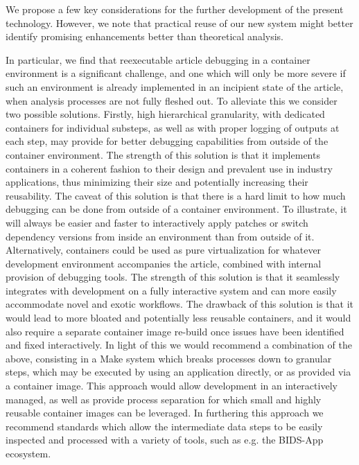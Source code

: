 We propose a few key considerations for the further development of the present technology.
However, we note that practical reuse of our new system might better identify promising enhancements better than theoretical analysis.

In particular, we find that reexecutable article debugging in a container environment is a significant challenge, and one which will only be more severe if such an environment is already implemented in an incipient state of the article, when analysis processes are not fully fleshed out.
To alleviate this we consider two possible solutions.
Firstly, high hierarchical granularity, with dedicated containers for individual substeps, as well as with proper logging of outputs at each step, may provide for better debugging capabilities from outside of the container environment.
The strength of this solution is that it implements containers in a coherent fashion to their design and prevalent use in industry applications, thus minimizing their size and potentially increasing their reusability.
The caveat of this solution is that there is a hard limit to how much debugging can be done from outside of a container environment.
To illustrate, it will always be easier and faster to interactively apply patches or switch dependency versions from inside an environment than from outside of it.
Alternatively, containers could be used as pure virtualization for whatever development environment accompanies the article, combined with internal provision of debugging tools.
The strength of this solution is that it seamlessly integrates with development on a fully interactive system and can more easily accommodate novel and exotic workflows.
The drawback of this solution is that it would lead to more bloated and potentially less reusable containers, and it would also require a separate container image re-build once issues have been identified and fixed interactively.
In light of this we would recommend a combination of the above, consisting in a Make system which breaks processes down to granular steps, which may be executed by using an application directly, or as provided via a container image.
This approach would allow development in an interactively managed, as well as provide process separation for which small and highly reusable container images can be leveraged.
In furthering this approach we recommend standards which allow the intermediate data steps to be easily inspected and processed with a variety of tools, such as e.g. the BIDS-App ecosystem.

